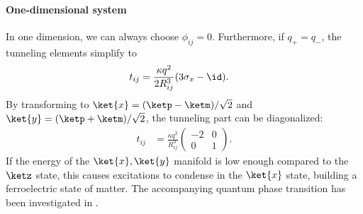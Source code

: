 \paragraph{One-dimensional system}
In one dimension, we can always choose $\phi_{ij}=0$. Furthermore, if $q_+=q_-$, the tunneling
elements simplify to
\begin{align}
    t_{ij} &= \frac{\kappa q^2}{2R_{ij}^3} (3\sigma_x-\id).
\end{align}
By transforming to $\ket{x}=(\ketp-\ketm)/\sqrt{2}$ and $\ket{y}=(\ketp+\ketm)/\sqrt{2}$, the
tunneling part can be diagonalized:
\begin{align}
    t_{ij} &= \frac{\kappa q^2}{R_{ij}^3} \begin{pmatrix}
    -2 & 0 \\
    0 & 1
    \end{pmatrix}.
\end{align}
If the energy of the $\ket{x}, \ket{y}$ manifold is low enough compared to the $\ketz$ state, this
causes excitations to condense in the $\ket{x}$ state, building a ferroelectric state of matter. The accompanying quantum phase transition has been investigated in .

